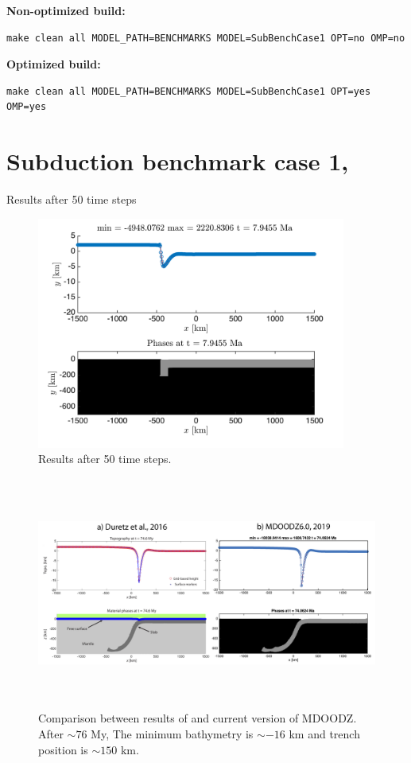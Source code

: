 \documentclass[12pt,english,openany]{scrbook}
\begin{document}
\textbf{Non-optimized build:}  
\begin{verbatim} 
make clean all MODEL_PATH=BENCHMARKS MODEL=SubBenchCase1 OPT=no OMP=no
\end{verbatim}
\textbf{Optimized build:}  
\begin{verbatim} 
make clean all MODEL_PATH=BENCHMARKS MODEL=SubBenchCase1 OPT=yes OMP=yes
\end{verbatim}
\section{Subduction benchmark case 1, \citet{Schmeling08}}

Results after 50 time steps

\begin{figure}[ht!]
\centerline{\includegraphics[height=3.0in]{./Figures/SubBench1_50steps_MDOODZ}}
\caption{Results after 50 time steps.}
\label{SubBench1}
\end{figure}

\begin{figure}[ht!]
\centerline{\includegraphics[height=3.0in]{./Figures/SubBench1_MDOODZ}}
\caption{Comparison between results of \citet{Duretz16} and current version of MDOODZ. After $\sim76$ My, The minimum bathymetry is $\sim-16$ km and trench position is $\sim150$ km.}
\label{SubBench1}
\end{figure}
\end{document}
